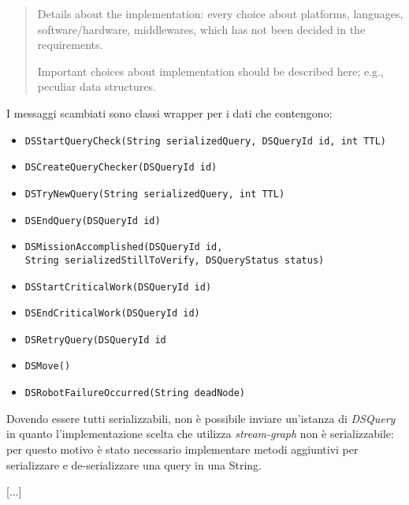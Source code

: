 \begin{quote}
Details about the implementation: every choice about platforms,
languages, software/hardware, middlewares, which has not been decided
in the requirements.

Important choices about implementation should be described here;
e.g., peculiar data structures.
\end{quote}



I messaggi scambiati sono classi wrapper per i dati che contengono:
\begin{itemize}
\item \texttt{DSStartQueryCheck(String serializedQuery,
  DSQueryId id, int TTL)}
\item \texttt{DSCreateQueryChecker(DSQueryId id)}
\item \texttt{DSTryNewQuery(String serializedQuery, int TTL)}
\item \texttt{DSEndQuery(DSQueryId id)}
\item \texttt{DSMissionAccomplished(DSQueryId id,\\
  \phantom{....}
  String serializedStillToVerify, DSQueryStatus status)}
\item \texttt{DSStartCriticalWork(DSQueryId id)}
\item \texttt{DSEndCriticalWork(DSQueryId id)}
\item \texttt{DSRetryQuery(DSQueryId id}
\item \texttt{DSMove()}
\item \texttt{DSRobotFailureOccurred(String deadNode)}
\end{itemize}

Dovendo essere tutti serializzabili, non è possibile inviare
un'istanza di \emph{DSQuery} in quanto l'implementazione scelta che
utilizza \emph{stream-graph} non è serializzabile:
per questo motivo è stato necessario implementare metodi
aggiuntivi per serializzare e de-serializzare una query in
una String.

[...]

